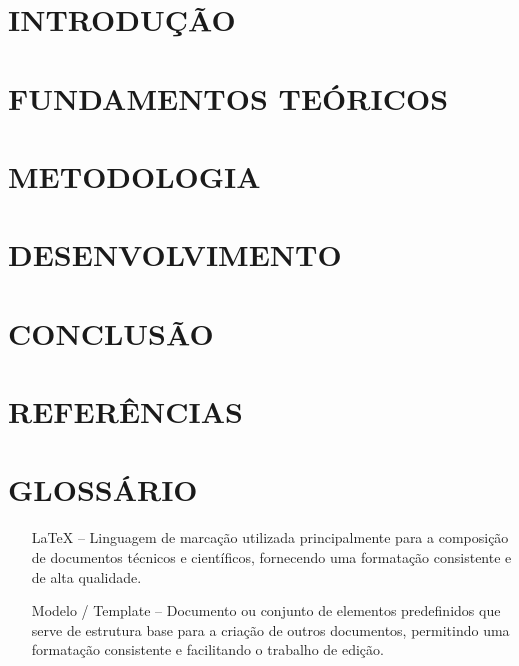 \documentclass[recuosum=1.5cm]{iftex2024}
\begin{document}
\maketitle

\chapter{INTRODUÇÃO}

 

\chapter{FUNDAMENTOS TEÓRICOS}



\chapter{METODOLOGIA}

 

\chapter{DESENVOLVIMENTO}



\chapter{CONCLUSÃO}

 

\chapter*{REFERÊNCIAS}

\printbibliography

\chapter*{GLOSSÁRIO}

\begin{itemize}[]
\item[LaTeX] -- Linguagem de marcação utilizada principalmente para a composição de documentos técnicos e científicos, fornecendo uma formatação consistente e de alta qualidade.
\item[Modelo / Template] -- Documento ou conjunto de elementos predefinidos que serve de estrutura base para a criação de outros documentos, permitindo uma formatação consistente e facilitando o trabalho de edição.
\end{itemize}
\end{document}
